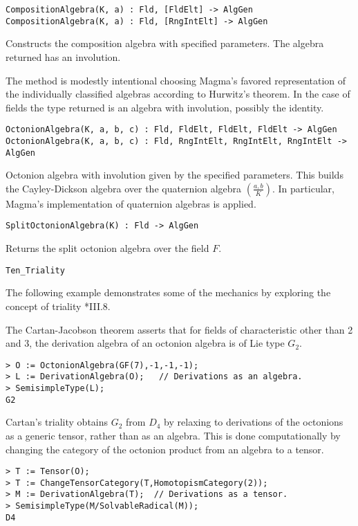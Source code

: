\color{blue}
{\small \begin{verbatim}
CompositionAlgebra(K, a) : Fld, [FldElt] -> AlgGen
CompositionAlgebra(K, a) : Fld, [RngIntElt] -> AlgGen
\end{verbatim}}
\color{black}

Constructs the composition algebra with specified parameters.  The algebra returned
has an involution.  

The method is modestly intentional choosing Magma's favored representation of
the individually classified algebras according to Hurwitz's theorem.  In the case of
fields the type returned is an algebra with involution, possibly the identity.


\color{blue}
{\small \begin{verbatim}
OctonionAlgebra(K, a, b, c) : Fld, FldElt, FldElt, FldElt -> AlgGen
OctonionAlgebra(K, a, b, c) : Fld, RngIntElt, RngIntElt, RngIntElt -> AlgGen
\end{verbatim}}
\color{black}

Octonion algebra with involution given by the specified parameters.
This builds the Cayley-Dickson algebra over the quaternion algebra
$\left(\frac{a,b}{K}\right)$.  In particular, Magma's implementation
of quaternion algebras is applied.

\color{blue}
{\small \begin{verbatim}
SplitOctonionAlgebra(K) : Fld -> AlgGen
\end{verbatim}}
\color{black}

Returns the split octonion algebra over the field $F$.


\begin{framed}
 {\tt Ten\_Triality}\\
{\small
The following example demonstrates some of the mechanics by exploring
the concept of triality \cite{Schafer}*{III.8}.

The Cartan-Jacobson theorem asserts that for fields of characteristic other
than 2 and 3, the derivation algebra of an octonion algebra is of Lie type 
$G_2$.
\begin{lstlisting}[frame=single,basicstyle=\ttfamily\color{black!30!
teal},backgroundcolor=\color{white!70!gray}]
> O := OctonionAlgebra(GF(7),-1,-1,-1);
> L := DerivationAlgebra(O);   // Derivations as an algebra.
> SemisimpleType(L);
G2
\end{lstlisting}
Cartan's triality obtains $G_2$ from $D_4$ by relaxing to
derivations of the octonions as a generic tensor, rather than as an 
algebra.  
This is done computationally by changing the category of the octonion product
from an algebra to a tensor.
\begin{lstlisting}[frame=single,basicstyle=\ttfamily\color{black!30!
teal},backgroundcolor=\color{white!70!gray}]
> T := Tensor(O);
> T := ChangeTensorCategory(T,HomotopismCategory(2)); 
> M := DerivationAlgebra(T);  // Derivations as a tensor.
> SemisimpleType(M/SolvableRadical(M));
D4
\end{lstlisting}
}
\end{framed}

